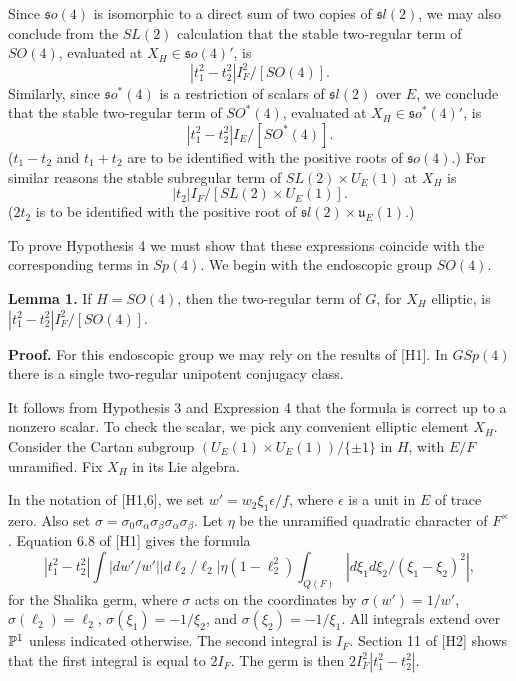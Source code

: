 \documentclass{amsart}
\begin{document}
Since ${\mathfrak so}(4)$ is isomorphic to a direct sum of two copies
of ${\mathfrak sl}(2)$, we may also conclude from the $SL(2)$
calculation that the stable two-regular term of $SO(4)$, evaluated at
$X_H\in {\mathfrak so}(4) '$, is
\begin{equation}\label{eqn:4}
|t_1^2 -t_2^2| I_F^2/[SO(4)].
\end{equation}
Similarly, since ${\mathfrak so}^*(4)$ is a restriction of
scalars of ${\mathfrak sl}(2)$ over $E$, we conclude that the
stable
two-regular term of $SO^*(4)$, evaluated at 
$X_H\in {\mathfrak so}^*(4)'$,
is
\begin{equation}\label{eqn:5}
|t_1^2 -t_2^2| I_E/[SO^*(4)].
\end{equation}
($t_1-t_2$ and $t_1+t_2$ are to be identified with the
positive roots of ${\mathfrak so}(4)$.)
For similar reasons the stable subregular term of
$SL(2)\times U_E(1)$ at $X_H$ is
\begin{equation}\label{eqn:6}
|t_2| I_F/[SL(2)\times U_E(1)].
\end{equation}
($2t_2$ is to be identified with the positive root of ${\mathfrak sl}(2)
\times {\mathfrak u}_E(1)$.)

To prove Hypothesis 4 we must show that these expressions coincide
with the corresponding terms in $Sp(4)$.  We begin with the endoscopic
group $SO(4)$.

{\bf Lemma 1.}  If $H=SO(4)$, then the two-regular term of
$G$, for $X_H$ elliptic, is
$|t_1^2 -t_2^2| I_F^2/[SO(4)]$.

{\bf Proof.}  For this endoscopic group we may rely on the results of
[H1].  In $GSp(4)$ there is a single two-regular unipotent conjugacy
class.

It follows from Hypothesis 3 and Expression 4 that the formula is
correct up to a nonzero scalar. To check the scalar, we pick any
convenient elliptic element $X_H$.  Consider the Cartan subgroup
$(U_E(1)\times U_E(1))/\{\pm1\}$ in $H$, with $E/F$ unramified. Fix
$X_H$ in its Lie algebra.

In the notation of [H1,6], we set
$w' = w_2 \xi_1 \epsilon/f$, where $\epsilon$ is a unit in $E$ of
trace zero.  Also set $\sigma = \sigma_0\sigma_\alpha\sigma_\beta
\sigma_\alpha\sigma_\beta$.  Let
$\eta$ be the unramified quadratic character of $F^\times$.
Equation 6.8 of [H1] gives the
formula
$$|t_1^2 -t_2^2| \int |dw'/w'| |d \ell_2/\ell_2| \eta(1-\ell_2^2)
\int_{Q(F)} |d\xi_1 d\xi_2/(\xi_1-\xi_2)^2|,$$
for the Shalika germ, where $\sigma$ acts on the coordinates
by $\sigma(w')=1/w'$, $\sigma(\ell_2)= \ell_2$, $\sigma(\xi_1)=-1/\xi_2$,
and $\sigma(\xi_2)=-1/\xi_1$.
All integrals extend over ${\Bbb P}^1$ unless indicated
otherwise. The second integral is $I_F$.
Section 11 of [H2] shows that the
first integral is equal to $2I_F$.
The germ is then $2I_F^2|t_1^2 -t_2^2|$.
\end{document}
